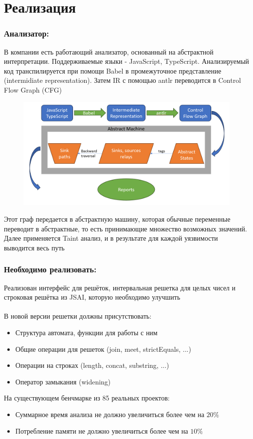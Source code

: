 \section{Реализация}

\subsubsection*{Анализатор:}
В компании есть работающий анализатор, основанный на абстрактной интерпретации. Поддерживаемые языки - JavaScript, TypeScript. Анализируемый код транспилируется при помощи Babel в промежуточное представление (intermidiate representation). Затем IR с помощью antlr переводится в Control Flow Graph (CFG)

\begin{figure}[H]
\includegraphics[width=\textwidth]{images/engine.png}\hfill
\end{figure}

Этот граф передается в абстрактную машину, которая обычные переменные переводит в абстрактные, то есть принимающие множество возможных значений. Далее применяется Taint анализ, и в результате для каждой уязвимости выводится весь путь

\newpage
\subsubsection*{Необходимо реализовать:}
Реализован интерфейс для решёток, интервальная решетка для целых чисел и строковая решётка из JSAI, которую необходимо улучшить\\ \\
В новой версии решетки должны присутствовать:
\begin{itemize}
    \item Структура автомата, функции для работы с ним
    \item Общие операции для решеток (join, meet, strictEquals, ...)
    \item Операции на строках (length, concat, substring, ...)
    \item Оператор замыкания (widening)
\end{itemize}
На существующем бенчмарке из 85 реальных проектов:
\begin{itemize}
    \item Суммарное время анализа не должно увеличиться более чем на $20\%$
    \item Потребление памяти не должно увеличиться более чем на $10\%$
\end{itemize}



